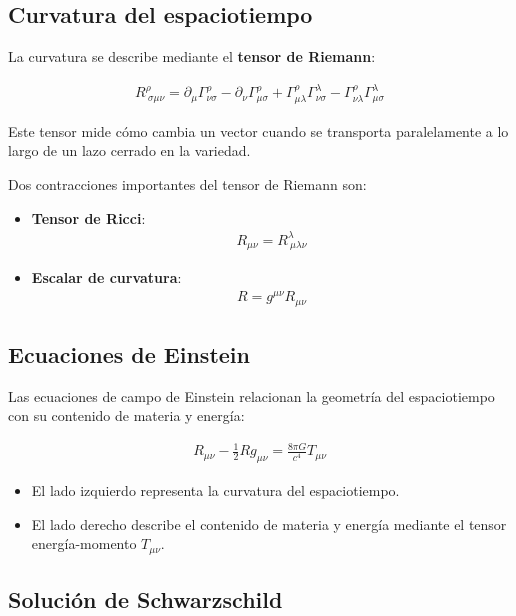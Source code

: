 \documentclass{aleph-revista}
\begin{document}
\subsection{Curvatura del espaciotiempo}

La curvatura se describe mediante el \textbf{tensor de Riemann}:

\begin{align*}
R^\rho_{\ \sigma\mu\nu} = \partial_\mu \Gamma^\rho_{\nu\sigma} - \partial_\nu \Gamma^\rho_{\mu\sigma} + \Gamma^\rho_{\mu\lambda} \Gamma^\lambda_{\nu\sigma} - \Gamma^\rho_{\nu\lambda} \Gamma^\lambda_{\mu\sigma}
\end{align*}

Este tensor mide cómo cambia un vector cuando se transporta paralelamente a lo largo de un lazo cerrado en la variedad.

Dos contracciones importantes del tensor de Riemann son:

\begin{itemize}
  \item \textbf{Tensor de Ricci}:
  \begin{align*}
  R_{\mu\nu} = R^\lambda_{\ \mu\lambda\nu}
  \end{align*}
  \item \textbf{Escalar de curvatura}:
  \begin{align*}
  R = g^{\mu\nu} R_{\mu\nu}
  \end{align*}
\end{itemize}

\subsection{Ecuaciones de Einstein}

Las ecuaciones de campo de Einstein relacionan la geometría del espaciotiempo con su contenido de materia y energía:

\begin{align*}
R_{\mu\nu} - \frac{1}{2} R g_{\mu\nu} = \frac{8\pi G}{c^4} T_{\mu\nu}
\end{align*}

\begin{itemize}
  \item El lado izquierdo representa la curvatura del espaciotiempo.
  \item El lado derecho describe el contenido de materia y energía mediante el tensor energía-momento \(T_{\mu\nu}\).
\end{itemize}

\subsection{Solución de Schwarzschild}
\end{document}
